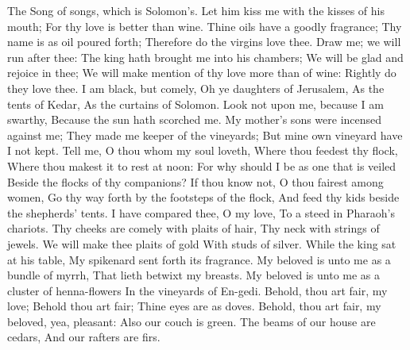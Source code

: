 


The Song of songs, which is Solomon’s.  Let him kiss me with the kisses of his mouth; For thy love is better than wine.  Thine oils have a goodly fragrance; Thy name is as oil poured forth; Therefore do the virgins love thee.  Draw me; we will run after thee: The king hath brought me into his chambers; We will be glad and rejoice in thee; We will make mention of thy love more than of wine: Rightly do they love thee.  I am black, but comely, Oh ye daughters of Jerusalem, As the tents of Kedar, As the curtains of Solomon.  Look not upon me, because I am swarthy, Because the sun hath scorched me. My mother’s sons were incensed against me; They made me keeper of the vineyards; But mine own vineyard have I not kept.  Tell me, O thou whom my soul loveth, Where thou feedest thy flock, Where thou makest it to rest at noon: For why should I be as one that is veiled Beside the flocks of thy companions?  If thou know not, O thou fairest among women, Go thy way forth by the footsteps of the flock, And feed thy kids beside the shepherds’ tents.  I have compared thee, O my love, To a steed in Pharaoh’s chariots.  Thy cheeks are comely with plaits of hair, Thy neck with strings of jewels.  We will make thee plaits of gold With studs of silver.  While the king sat at his table, My spikenard sent forth its fragrance.  My beloved is unto me as a bundle of myrrh, That lieth betwixt my breasts.  My beloved is unto me as a cluster of henna-flowers In the vineyards of En-gedi.  Behold, thou art fair, my love; Behold thou art fair; Thine eyes are as doves.  Behold, thou art fair, my beloved, yea, pleasant: Also our couch is green.  The beams of our house are cedars, And our rafters are firs. 

